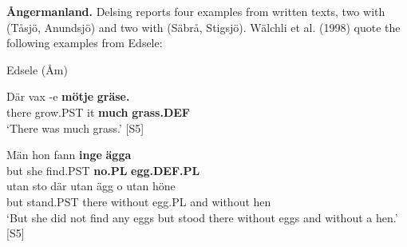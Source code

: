 
\textbf{Ångermanland.} Delsing reports four examples from written texts, two with  (Tåsjö, Anundsjö) and two with (Säbrå, Stigsjö). Wälchli et al. (1998) quote the following examples from Edsele:


\item 

Edsele (Åm)



\item 


 \ea\label{}
\gll Där  vax  {}-e  \textbf{mötje}\textbf{  gräse.}\\


there  grow.PST  it  \textbf{much} \textbf{grass.DEF}\\

\glt ‘There was much grass.’ [S5]

\z

\item 


 \ea\label{}
\gll Män  hon  fann  \textbf{inge} \textbf{ägga}\\


but  she  find.PST  \textbf{no.PL} \textbf{egg.DEF.PL}\\

 \ea\label{}
\gll utan  sto  där  utan  ägg  o  utan  höne\\


but  stand.PST  there  without  egg.PL  and  without  hen\\

\glt ‘But she did not find any eggs but stood there without eggs and without a hen.’ [S5]

